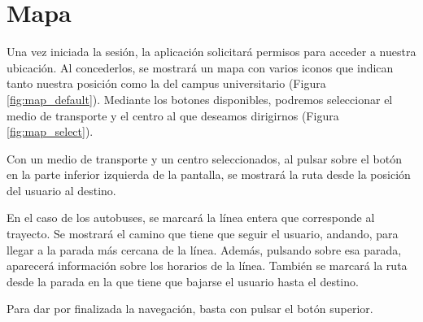 \documentclass[a4paper,12pt]{report}
\begin{document}
\section{Mapa}
  Una vez iniciada la sesión, la aplicación solicitará permisos para acceder a nuestra ubicación. Al concederlos, se mostrará un mapa con varios iconos que indican tanto nuestra posición como la del campus universitario (Figura \ref{fig:map_default}). Mediante los botones disponibles, podremos seleccionar el medio de transporte y el centro al que deseamos dirigirnos (Figura \ref{fig:map_select}).

  Con un medio de transporte y un centro seleccionados, al pulsar sobre el botón en la parte inferior izquierda de la pantalla, se mostrará la ruta desde la posición del usuario al destino.
  
  En el caso de los autobuses, se marcará la línea entera que corresponde al trayecto. Se mostrará el camino que tiene que seguir el usuario, andando, para llegar a la parada más cercana de la línea. Además, pulsando sobre esa parada, aparecerá información sobre los horarios de la línea. También se marcará la ruta desde la parada en la que tiene que bajarse el usuario hasta el destino.

  Para dar por finalizada la navegación, basta con pulsar el botón superior.
\end{document}
